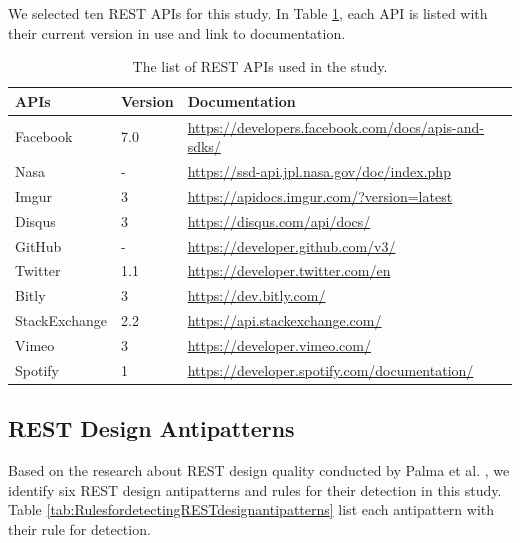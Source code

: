 We selected ten REST APIs for this study. In Table \ref{tab:APIsusedintheresearch}, each API is listed with their current version in use and link to documentation.

\begin{center}
\begin{table}[!ht]
\small
\begin{tabular}{|p{25mm}|p{12mm}|p{100mm}|}
\hline \textbf{APIs} & \textbf{Version} & \textbf{Documentation} \\
\hline 
Facebook &
7.0 & 
\url{https://developers.facebook.com/docs/apis-and-sdks/} 
\\ \hline
Nasa &
- &
\url{https://ssd-api.jpl.nasa.gov/doc/index.php}
\\ \hline
Imgur &
3 & 
\url{https://apidocs.imgur.com/?version=latest}
\\ \hline
Disqus &
3 & 
\url{https://disqus.com/api/docs/}
\\ \hline
GitHub &
- & 
\url{https://developer.github.com/v3/}
\\ \hline
Twitter &
1.1 & 
\url{https://developer.twitter.com/en}
\\ \hline
Bitly &
3 & 
\url{https://dev.bitly.com/}
\\ \hline
StackExchange &
2.2 & 
\url{https://api.stackexchange.com/}
\\ \hline
Vimeo &
3 & 
\url{https://developer.vimeo.com/}
\\ \hline
Spotify &
1 & 
\url{https://developer.spotify.com/documentation/}
\\ \hline
\end{tabular}
 \caption{The list of REST APIs used in the study.}
 \label{tab:APIsusedintheresearch}
\end{table}
\end{center}

\subsection{REST Design Antipatterns}

Based on the research about REST design quality conducted by Palma et al. \cite{design}, we identify six REST design antipatterns and rules for their detection in this study. Table \ref{tab:RulesfordetectingRESTdesignantipatterns} list each antipattern with their rule for detection.

